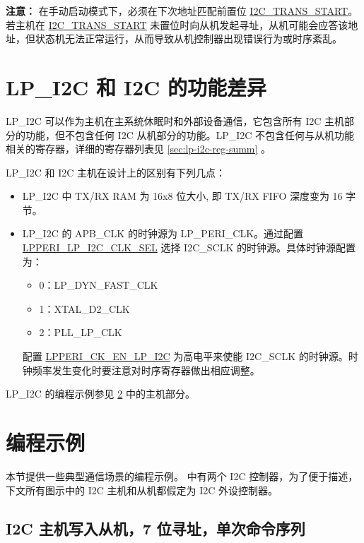 \documentclass[main\_\_CN.tex]{subfiles}
\begin{document}
{\bfseries 注意：}
在手动启动模式下，必须在下次地址匹配前置位 \hyperref[fielddesc:I2CTRANSSTART]{I2C\_TRANS\_START}。
若主机在 \hyperref[fielddesc:I2CTRANSSTART]{I2C\_TRANS\_START} 未置位时向从机发起寻址，从机可能会应答该地址，但状态机无法正常运行，从而导致从机控制器出现错误行为或时序紊乱。

\section{LP\_I2C 和 I2C 的功能差异}

LP\_I2C 可以作为主机在主系统休眠时和外部设备通信，它包含所有 \chipname{} I2C 主机部分的功能，但不包含任何 \chipname{} I2C 从机部分的功能。LP\_I2C 不包含任何与从机功能相关的寄存器，详细的寄存器列表见 \ref{sec:lp-i2c-reg-summ} 。

LP\_I2C 和 I2C 主机在设计上的区别有下列几点：

\begin{itemize}
    \item LP\_I2C 中 TX/RX RAM 为 16x8 位大小, 即 TX/RX FIFO 深度变为 16 字节。
    \item LP\_I2C 的 APB\_CLK 的时钟源为 LP\_PERI\_CLK。通过配置 \hyperref[fielddesc:LPPERILPI2CCLKSEL]{LPPERI\_LP\_I2C\_CLK\_SEL} 选择 I2C\_SCLK 的时钟源。具体时钟源配置为：
    \begin{itemize}
        \item 0：LP\_DYN\_FAST\_CLK
        \item 1：XTAL\_D2\_CLK
        \item 2：PLL\_LP\_CLK
    \end{itemize}
    配置 \hyperref[fielddesc:LPPERILPI2CCLKSEL]{LPPERI\_CK\_EN\_LP\_I2C} 为高电平来使能 I2C\_SCLK 的时钟源。时钟频率发生变化时要注意对时序寄存器做出相应调整。
\end{itemize}

LP\_I2C 的编程示例参见 \ref{subsec:i2c-prom-guide} 中的主机部分。

\section{编程示例}\label{subsec:i2c-prom-guide}
本节提供一些典型通信场景的编程示例。\chipname{} 中有两个 I2C 控制器，为了便于描述，下文所有图示中的 I2C 主机和从机都假定为 \chipname{} I2C 外设控制器。

\subsection{I2C 主机写入从机，7 位寻址，单次命令序列}\label{subsec:i2c-mws7}
\end{document}
